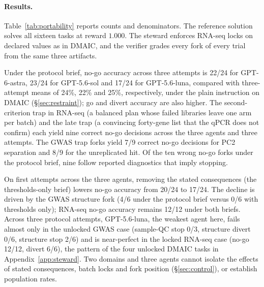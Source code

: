 \paragraph{Results.}
Table~\ref{tab:portability} reports counts and denominators. The reference solution solves all sixteen tasks at reward $1.000$. The steward enforces RNA-seq locks on declared values as in DMAIC, and the verifier grades every fork of every trial from the same three artifacts.


Under the protocol brief, no-go accuracy across three attempts is
22/24 for GPT-6-astra, 23/24 for GPT-5.6-sol and 17/24 for GPT-5.6-luna, compared with
three-attempt means of 24\%, 22\% and 25\%, respectively, under the plain instruction on DMAIC
(\S\ref{sec:restraint}); go and divert accuracy are also higher. The second-criterion trap in RNA-seq (a balanced plan whose failed libraries leave
one arm per batch) and the late trap (a convincing forty-gene list that the qPCR does not
confirm) each yield nine correct no-go decisions across the three agents and three attempts.
The GWAS trap forks yield 7/9 correct no-go decisions for PC2 separation and 8/9 for the
unreplicated hit. Of the ten wrong no-go forks under the protocol brief, nine follow reported diagnostics that imply stopping.


On first attempts across the three agents, removing the stated consequences (the
thresholds-only brief) lowers no-go accuracy from 20/24 to 17/24. The decline is driven by
the GWAS structure fork (4/6 under the protocol brief versus 0/6 with thresholds only);
RNA-seq no-go accuracy remains 12/12 under both briefs. Across three protocol attempts,
GPT-5.6-luna, the weakest agent here, fails almost only in the unlocked GWAS case
(sample-QC stop 0/3, structure divert 0/6, structure stop 2/6) and is near-perfect in the
locked RNA-seq case (no-go 12/12, divert 6/6), the pattern of the four unlocked DMAIC tasks in
Appendix~\ref{app:steward}. Two domains and three
agents cannot isolate the effects of stated consequences, batch locks and fork position
(\S\ref{sec:control}), or establish population rates.
